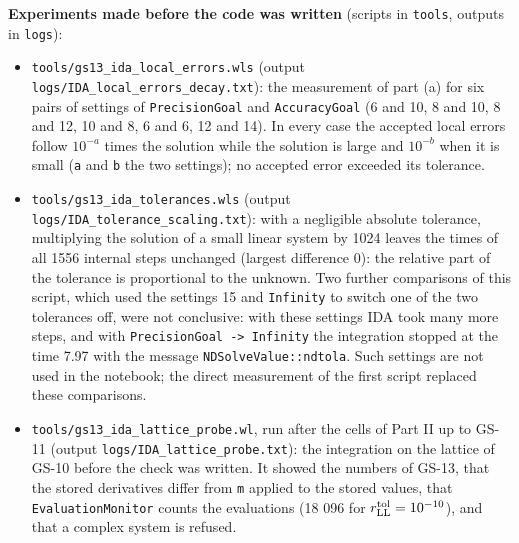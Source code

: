 \documentclass[
  10pt,
]{article}
\providecommand{\tightlist}{%
  \setlength{\itemsep}{0pt}\setlength{\parskip}{0pt}}
\begin{document}
\textbf{Experiments made before the code was written} (scripts in
\texttt{tools}, outputs in \texttt{logs}):

\begin{itemize}
\tightlist
\item
  \texttt{tools/gs13\_ida\_local\_errors.wls} (output
  \texttt{logs/IDA\_local\_errors\_decay.txt}): the measurement of part
  (a) for six pairs of settings of \texttt{PrecisionGoal} and
  \texttt{AccuracyGoal} (6 and 10, 8 and 10, 8 and 12, 10 and 8, 6 and
  6, 12 and 14). In every case the accepted local errors follow
  \(10^{-a}\) times the solution while the solution is large and
  \(10^{-b}\) when it is small (\texttt{a} and \texttt{b} the two
  settings); no accepted error exceeded its tolerance.
\item
  \texttt{tools/gs13\_ida\_tolerances.wls} (output
  \texttt{logs/IDA\_tolerance\_scaling.txt}): with a negligible absolute
  tolerance, multiplying the solution of a small linear system by 1024
  leaves the times of all 1556 internal steps unchanged (largest
  difference 0): the relative part of the tolerance is proportional to
  the unknown. Two further comparisons of this script, which used the
  settings 15 and \texttt{Infinity} to switch one of the two tolerances
  off, were not conclusive: with these settings IDA took many more
  steps, and with \texttt{PrecisionGoal\ -\textgreater{}\ Infinity} the
  integration stopped at the time 7.97 with the message
  \texttt{NDSolveValue::ndtola}. Such settings are not used in the
  notebook; the direct measurement of the first script replaced these
  comparisons.
\item
  \texttt{tools/gs13\_ida\_lattice\_probe.wl}, run after the cells of
  Part II up to GS-11 (output \texttt{logs/IDA\_lattice\_probe.txt}):
  the integration on the lattice of GS-10 before the check was written.
  It showed the numbers of GS-13, that the stored derivatives differ
  from \texttt{m} applied to the stored values, that
  \texttt{EvaluationMonitor} counts the evaluations (18 096 for
  \(r^{\rm tol}_{\rm LL}=10^{-10}\)), and that a complex system is
  refused.
\end{itemize}
\end{document}
